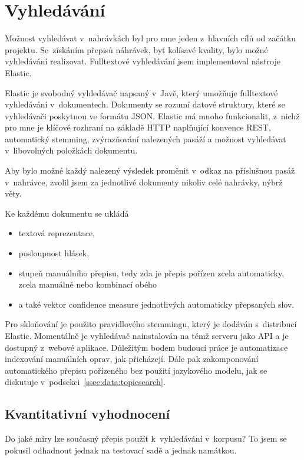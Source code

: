 \chapter{Vyhledávání}
\label{kap:vyhledavani}

Možnost vyhledávat v~nahrávkách byl pro mne jeden z~hlavních cílů od začátku
projektu. Se~získáním přepisů náhrávek, byť kolísavé kvality, bylo možné
vyhledávání realizovat.
Fulltextové vyhledávání jsem implementoval nástroje Elastic.

Elastic je svobodný vyhledávač napsaný v~Javě, který umožňuje fulltextové
vyhledávání v~dokumentech. Dokumenty se rozumí datové struktury, které se
vyhledávači poskytnou ve formátu JSON. Elastic má mnoho funkcionalit,
z~nichž pro mne je klíčové rozhraní na základě HTTP naplňující konvence REST,
automatický stemming, zvýrazňování nalezených pasáží a možnost vyhledávat
v~libovolných položkách dokumentu.

Aby bylo možné každý nalezený výsledek proměnit v~odkaz na příslušnou pasáž
v~nahrávce, zvolil jsem za jednotlivé dokumenty nikoliv celé nahrávky, nýbrž
věty.

Ke každému dokumentu se ukládá
\begin{itemize}
\item{textová reprezentace,}
\item{posloupnost hlásek,}
\item{stupeň
manuálního přepisu, tedy zda je přepis pořízen zcela automaticky, zcela manuálně
nebo kombinací obého}
\item{a také vektor confidence measure jednotlivých automaticky přepsaných slov.}
\end{itemize}

Pro skloňování je použito pravidlového stemmingu, který je dodáván s~distribucí
Elastic.
Momentálně je vyhledávač nainstalován na témž serveru jako API a je dostupný
z~webové aplikace. Důležitým bodem budoucí práce je automatizace indexování
manuálních oprav, jak přicházejí. Dále pak zakomponování automatického přepisu
pořízeného bez použití jazykového modelu, jak se diskutuje
v~podsekci~\ref{ssec:data:topicsearch}.

\section{Kvantitativní vyhodnocení}

Do jaké míry lze současný přepis použít k~vyhledávání v~korpusu? To jsem se
pokusil odhadnout jednak na testovací sadě a jednak namátkou.

